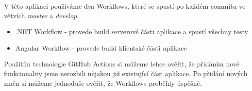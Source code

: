 V této aplikaci používáme dva Workflows, které se spustí po každém commitu ve větvích \textit{master} a \textit{develop}.
\begin{itemize}
	\item .NET Workflow - provede build serverové části aplikace a spustí všechny testy
	\item Angular Workflow - provede build klientské části aplikace
\end{itemize}

Použitím technologie GitHub Actions si můžeme lehce ověřit, že přidáním nové funkcionality jsme nerozbili nějakou již existující část aplikace. Po přidání nových změn si můžeme jednoduše ověřit, že Workflows proběhly úspěšně.
